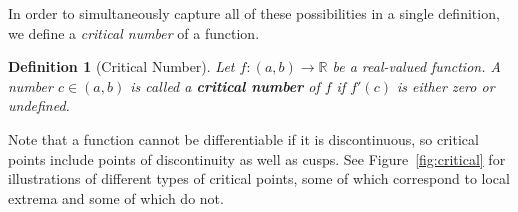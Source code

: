 \documentclass[11pt]{article}
\newtheorem*{definition}{Definition} %
\theoremstyle{definition} %
\begin{document}
In order to simultaneously capture all of these possibilities in a single definition, we define a \textit{critical number} of a function.

\begin{definition}[Critical Number]
	Let $f : (a,b) \to \mathbb{R}$ be a real-valued function. A number $c \in (a,b)$ is called a \textbf{critical number} of $f$ if $f'(c)$ is either zero or undefined.
\end{definition}

Note that a function cannot be differentiable if it is discontinuous, so critical points include points of discontinuity as well as cusps. See Figure~\ref{fig:critical} for illustrations of different types of critical points, some of which correspond to local extrema and some of which do not.

\begin{figure}[h]
	\centering
	

\end{figure}
\end{document}
